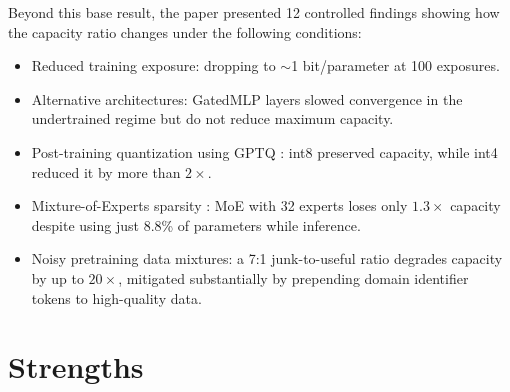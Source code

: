\documentclass{article}
\begin{document}
Beyond this base result, the paper presented 12 controlled findings showing how the capacity ratio changes under the following conditions:
\begin{itemize}[leftmargin=*]
  \item Reduced training exposure: dropping to $\sim$1 bit/parameter at 100 exposures.
  \item Alternative architectures: GatedMLP layers slowed convergence in the undertrained regime but do not reduce maximum capacity.
  \item Post-training quantization using GPTQ \cite{frantar2022gptq}: int8 preserved capacity, while int4 reduced it by more than $2\times$.
  \item Mixture-of-Experts sparsity \cite{fedus2022switch}: MoE with 32 experts loses only $1.3\times$ capacity despite using just 8.8\% of parameters while inference.
  \item Noisy pretraining data mixtures: a 7:1 junk-to-useful ratio degrades capacity by up to $20\times$, mitigated substantially by prepending domain identifier tokens to high-quality data.
\end{itemize}

\section{Strengths}
\end{document}
